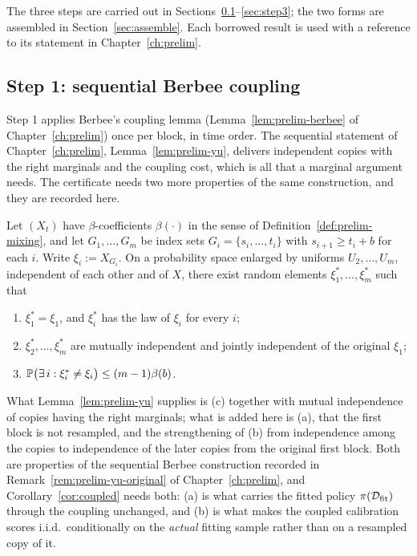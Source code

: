 \documentclass[../../../main.tex]{subfiles}
\begin{document}
The three steps are carried out in Sections~\ref{sec:step1}--\ref{sec:step3}; the two forms are assembled in Section~\ref{sec:assemble}. Each borrowed result is used with a reference to its statement in Chapter~\ref{ch:prelim}.

\subsection{Step 1: sequential Berbee coupling}\label{sec:step1}

Step 1 applies Berbee's coupling lemma (Lemma~\ref{lem:prelim-berbee} of Chapter~\ref{ch:prelim}) once per block, in time order. The sequential statement of Chapter~\ref{ch:prelim}, Lemma~\ref{lem:prelim-yu}, delivers independent copies with the right marginals and the coupling cost, which is all that a marginal argument needs. The certificate needs two more properties of the same construction, and they are recorded here.

\begin{lemma}\label{lem:firstblock}
Let $(X_t)$ have $\beta$-coefficients $\beta(\cdot)$ in the sense of Definition~\ref{def:prelim-mixing}, and let $G_1,\dots,G_m$ be index sets $G_i=\{s_i,\dots,t_i\}$ with $s_{i+1}\ge t_i+b$ for each $i$. Write $\xi_i:=X_{G_i}$. On a probability space enlarged by uniforms $U_2,\dots,U_m$, independent of each other and of $X$, there exist random elements $\xi^*_1,\dots,\xi^*_m$ such that
\begin{enumerate}[nosep,label=(\alph*)]
\item $\xi^*_1=\xi_1$, and $\xi^*_i$ has the law of $\xi_i$ for every $i$;
\item $\xi^*_2,\dots,\xi^*_m$ are mutually independent and jointly independent of the original $\xi_1$;
\item $\mathbb{P}\big(\exists\,i:\xi^*_i\ne\xi_i\big)\le(m-1)\beta(b)$.
\end{enumerate}
\end{lemma}

What Lemma~\ref{lem:prelim-yu} supplies is (c) together with mutual independence of copies having the right marginals; what is added here is (a), that the first block is not resampled, and the strengthening of (b) from independence among the copies to independence of the later copies from the original first block. Both are properties of the sequential Berbee construction recorded in Remark~\ref{rem:prelim-yu-original} of Chapter~\ref{ch:prelim}, and Corollary~\ref{cor:coupled} needs both: (a) is what carries the fitted policy $\pi(\mathcal D_{\mathrm{fit}})$ through the coupling unchanged, and (b) is what makes the coupled calibration scores i.i.d.\ conditionally on the \emph{actual} fitting sample rather than on a resampled copy of it.
\end{document}
